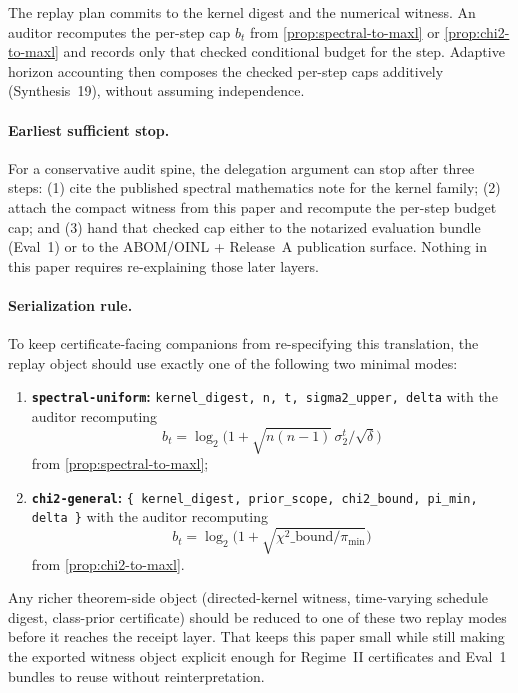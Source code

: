 \documentclass[11pt]{article}
\begin{document}
The replay plan commits to the kernel digest and the numerical witness.
An auditor recomputes the per-step cap $b_t$ from \cref{prop:spectral-to-maxl} or \cref{prop:chi2-to-maxl} and records only that checked conditional budget for the step.
Adaptive horizon accounting then composes the checked per-step caps additively (Synthesis~19), without assuming independence.\cite{series:accountingrulebook,series:condcert}

\paragraph{Earliest sufficient stop.}
For a conservative audit spine, the delegation argument can stop after three steps:
(1) cite the published spectral mathematics note for the kernel family;\cite{series:spectral}
(2) attach the compact witness from this paper and recompute the per-step budget cap; and
(3) hand that checked cap either to the notarized evaluation bundle (Eval~1) or to the ABOM/OINL + Release~A publication surface.\cite{series:notcert,series:abomoinl,series:releaseA}
Nothing in this paper requires re-explaining those later layers.

\paragraph{Serialization rule.}
To keep certificate-facing companions from re-specifying this translation, the replay object should use exactly one of the following two minimal modes:
\begin{enumerate}[leftmargin=1.4em]
\item \textbf{\texttt{spectral-uniform}:} \texttt{kernel\_digest, n, t, sigma2\_upper, delta} with the auditor recomputing
\[
 b_t = \log_2\!\Big(1+\sqrt{n(n-1)}\,\sigma_2^t/\sqrt{\delta}\Big)
\]
from \cref{prop:spectral-to-maxl};
\item \textbf{\texttt{chi2-general}:} \texttt{\{ kernel\_digest, prior\_scope, chi2\_bound, pi\_min, delta \}} with the auditor recomputing
\[
 b_t = \log_2\!\Big(1+\sqrt{\chi^2\_\text{bound}/\pi_{\min}}\Big)
\]
from \cref{prop:chi2-to-maxl}.
\end{enumerate}
Any richer theorem-side object (directed-kernel witness, time-varying schedule digest, class-prior certificate) should be reduced to one of these two replay modes before it reaches the receipt layer.
That keeps this paper small while still making the exported witness object explicit enough for Regime~II certificates and Eval~1 bundles to reuse without reinterpretation.\cite{series:condcert,series:notcert}
\end{document}
